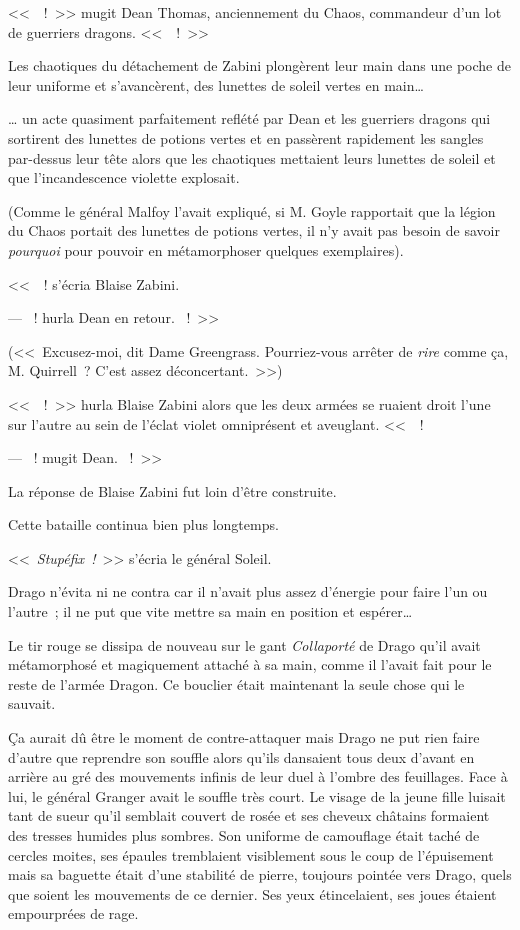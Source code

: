 <<~~!~>> mugit Dean Thomas, anciennement du Chaos, commandeur d'un lot de guerriers dragons. <<~~!~>>

Les chaotiques du détachement de Zabini plongèrent leur main dans une poche de leur uniforme et s'avancèrent, des lunettes de soleil vertes en main…

… un acte quasiment parfaitement reflété par Dean et les guerriers dragons qui sortirent des lunettes de potions vertes et en passèrent rapidement les sangles par-dessus leur tête alors que les chaotiques mettaient leurs lunettes de soleil et que l'incandescence violette explosait.

(Comme le général Malfoy l'avait expliqué, si M. Goyle rapportait que la légion du Chaos portait des lunettes de potions vertes, il n'y avait pas besoin de savoir \emph{pourquoi} pour pouvoir en métamorphoser quelques exemplaires).

<<~~! s'écria Blaise Zabini.

--- ~! hurla Dean en retour. ~!~>>

(<<~Excusez-moi, dit Dame Greengrass. Pourriez-vous arrêter de \emph{rire} comme ça, M. Quirrell~? C'est assez déconcertant.~>>)

<<~~!~>> hurla Blaise Zabini alors que les deux armées se ruaient droit l'une sur l'autre au sein de l'éclat violet omniprésent et aveuglant. <<~~!

--- ~! mugit Dean. ~!~>>

La réponse de Blaise Zabini fut loin d'être construite.

Cette bataille continua bien plus longtemps.

\later

<<~\emph{Stupéfix~!}~>> s'écria le général Soleil.

Drago n'évita ni ne contra car il n'avait plus assez d'énergie pour faire l'un ou l'autre~; il ne put que vite mettre sa main en position et espérer…

Le tir rouge se dissipa de nouveau sur le gant \emph{Collaporté} de Drago qu'il avait métamorphosé et magiquement attaché à sa main, comme il l'avait fait pour le reste de l'armée Dragon. Ce bouclier était maintenant la seule chose qui le sauvait.

Ça aurait dû être le moment de contre-attaquer mais Drago ne put rien faire d'autre que reprendre son souffle alors qu'ils dansaient tous deux d'avant en arrière au gré des mouvements infinis de leur duel à l'ombre des feuillages. Face à lui, le général Granger avait le souffle très court. Le visage de la jeune fille luisait tant de sueur qu'il semblait couvert de rosée et ses cheveux châtains formaient des tresses humides plus sombres. Son uniforme de camouflage était taché de cercles moites, ses épaules tremblaient visiblement sous le coup de l'épuisement mais sa baguette était d'une stabilité de pierre, toujours pointée vers Drago, quels que soient les mouvements de ce dernier. Ses yeux étincelaient, ses joues étaient empourprées de rage.

